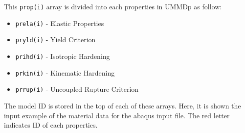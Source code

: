 \documentclass[11pt,a4paper,twoside,final,onecolumn,titlepage]{article}
\begin{document}
\noindent This \texttt{prop(i)} array is divided into each properties in UMMDp as follow:
\begin{itemize}
	\item \texttt{prela(i)} - Elastic Properties
	\item \texttt{pryld(i)} - Yield Criterion
	\item \texttt{prihd(i)} - Isotropic Hardening
	\item \texttt{prkin(i)} -  Kinematic Hardening
	\item \texttt{prrup(i)} -  Uncoupled Rupture Criterion
\end{itemize}

\noindent The model ID is stored in the top of each of these arrays. Here, it is shown the input example of the material data for the abaqus input file. The red letter indicates ID of each properties.
\par\bigskip
\par\bigskip
\noindent
\hspace{-0.75cm}
\texttt{}
\par\bigskip
\end{document}
